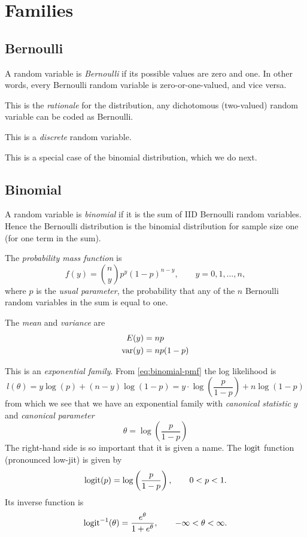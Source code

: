 
\chapter{Families}

\section{Bernoulli}
\label{sec:bernoulli}

A random variable is \emph{Bernoulli} if its possible values are zero and one.
In other words, every Bernoulli random variable is zero-or-one-valued,
and vice versa.

This is the \emph{rationale} for the distribution, any dichotomous (two-valued)
random variable can be coded as Bernoulli.

This is a \emph{discrete} random variable.

This is a special case of the binomial distribution, which we do next.

\section{Binomial}
\label{sec:binomial}

A random variable is \emph{binomial} if it is the sum of IID Bernoulli
random variables.  Hence the Bernoulli distribution is the binomial
distribution for sample size one (for one term in the sum).

The \emph{probability mass function} is
\begin{equation} \label{eq:binomial-pmf}
   f(y) = \binom{n}{y} p^y (1 - p)^{n - y}, \qquad y = 0, 1, \ldots, n,
\end{equation}
where $p$ is the \emph{usual parameter}, the probability that any of the
$n$ Bernoulli random variables in the sum is equal to one.

The \emph{mean} and \emph{variance} are
\begin{align*}
   E(y) & = n p
   \\
   \operatorname{var}(y) & = n p (1 - p)
\end{align*}

This is an \emph{exponential family}.  From \eqref{eq:binomial-pmf}
the log likelihood is
$$
   l(\theta) = y \log(p) + (n - y) \log(1 - p)
   = y \cdot \log\left(\frac{p}{1 - p}\right) + n \log(1 - p)
$$
from which we see that we have an exponential family with
\emph{canonical statistic} $y$ and \emph{canonical parameter}
$$
   \theta = \log\left(\frac{p}{1 - p}\right)
$$
The right-hand side is so important that it is given a name.  The
$\operatorname{logit}$ function (pronounced low-jit) is given by
$$
   \operatorname{logit}(p) = \log\left(\frac{p}{1 - p}\right), \qquad 0 < p < 1.
$$
Its inverse function is
$$
   \operatorname{logit}^{-1}(\theta) = \frac{e^\theta}{1 + e^\theta},
   \qquad - \infty < \theta < \infty.
$$

